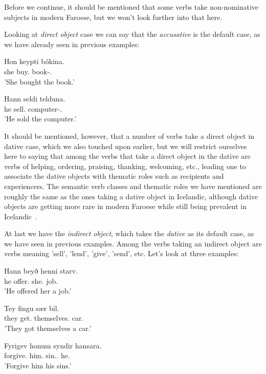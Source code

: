 \documentclass[12pt,%
]{lin-v2/lin}
\begin{document}
Before we continue, it should be mentioned that some verbs take non-nominative subjects in modern Faroese,
but we won't look further into that here.

Looking at \emph{direct object} case we can say that the \emph{accusative} is the default case,
as we have already seen in previous examples:
\begin{exe}
    \ex
    \begin{xlist}
        \item \gll Hon keypti bókina.\\
        she buy.\Pst{} book-\Det.\Acc\\
        \trans 'She bought the book.'
        \item \gll Hann seldi telduna.\\
        he sell.\Pst{} computer-\Det.\Acc\\
        \trans 'He sold the computer.'
    \end{xlist}
\end{exe}

It should be mentioned, however, that a number of verbs take a direct object in dative case, which we also touched upon earlier,
but we will restrict ourselves here to saying that among the verbs that take a direct object in the dative are
verbs of helping, ordering, praising, thanking, welcoming, etc., leading one to associate the dative objects with
thematic roles such as recipients and experiencers. The semantic verb classes and thematic roles we have mentioned are roughly
the same as the ones taking a dative object in Icelandic, although dative objects are getting more rare in modern Faroese
while still being prevalent in Icelandic~\citep[257-258]{faroese}.

At last we have the \emph{indirect object}, which takes the \emph{dative} as its default case, as we have seen in previous examples.
Among the verbs taking an indirect object are verbs meaning 'sell', 'lend', 'give', 'send', etc. Let's look at three examples:
\begin{exe}
    \ex
    \begin{xlist}
        \item \gll Hann beyð henni starv.\\
        he offer.\Pst{} she.\Dat{} job.\Acc\\
        \trans 'He offered her a job.'
        \item \gll Tey fingu sær bil.\\
        they get.\Pst{} themselves.\Dat{} car.\Acc\\
        \trans 'They got themselves a car.'
        \item \gll Fyrigev honum syndir hansara.\\
        forgive.\Imp{} him.\Dat{} sin.\Pl.\Acc{} he.\Gen\\
        \trans 'Forgive him his sins.'
    \end{xlist}
\end{exe}
\end{document}
